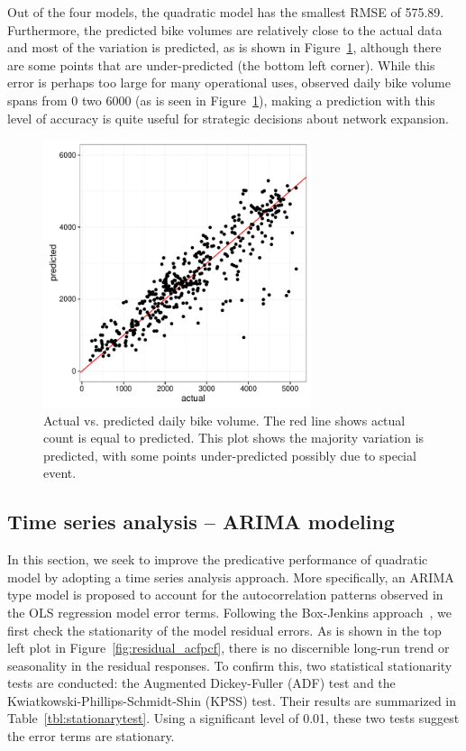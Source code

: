 \documentclass [11pt, proquest] {uwthesis}[2015/03/03]
\begin{document}
Out of the four models, the quadratic model has the smallest RMSE of 575.89. Furthermore, the predicted bike volumes are relatively close to the actual data and most of the variation is predicted, as is shown in Figure~\ref{fig:avpmodel0}, although there are some points that are under-predicted (the bottom left corner). While this error is perhaps too large for many operational uses, observed daily bike volume spans from 0 two 6000 (as is seen in Figure~\ref{fig:avpmodel0}), making a prediction with this level of accuracy is quite useful for strategic decisions about network expansion.
\begin{figure}
\centering
   \includegraphics[width=0.7\textwidth]{figures/actualvspred} 
  \caption{Actual vs. predicted daily bike volume. The red line shows actual count is equal to predicted. This plot shows the majority variation is predicted, with some points under-predicted possibly due to special event.}
  \label{fig:avpmodel0}
  \vspace{-.5in}
\end{figure}




\subsection{Time series analysis -- ARIMA modeling}

In this section, we seek to improve the predicative performance of quadratic model by adopting a time series analysis approach. More specifically, an ARIMA type model is proposed to account for the autocorrelation patterns observed in the OLS regression model error terms. Following the Box-Jenkins approach~\cite{Jenkins70}, we first check the stationarity of the model residual errors. As is shown in the top left plot in Figure~\ref{fig:residual_acfpcf}, there is no discernible long-run trend or seasonality in the residual responses. To confirm this, two statistical stationarity tests are conducted: the Augmented Dickey-Fuller (ADF) test and the Kwiatkowski-Phillips-Schmidt-Shin (KPSS) test. Their results are summarized in Table~\ref{tbl:stationarytest}. Using a significant level of 0.01, these two tests suggest the error terms are stationary.
\end{document}
